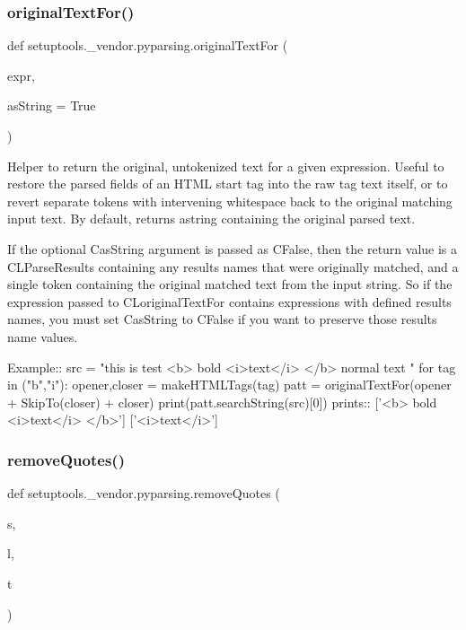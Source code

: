 \subsubsection{\texorpdfstring{original\+Text\+For()}{originalTextFor()}}
{\footnotesize\ttfamily def setuptools.\+\_\+vendor.\+pyparsing.\+original\+Text\+For (\begin{DoxyParamCaption}\item[{}]{expr,  }\item[{}]{as\+String = {\ttfamily True} }\end{DoxyParamCaption})}

\begin{DoxyVerb}Helper to return the original, untokenized text for a given expression.  Useful to
restore the parsed fields of an HTML start tag into the raw tag text itself, or to
revert separate tokens with intervening whitespace back to the original matching
input text. By default, returns astring containing the original parsed text.  
   
If the optional C{asString} argument is passed as C{False}, then the return value is a 
C{L{ParseResults}} containing any results names that were originally matched, and a 
single token containing the original matched text from the input string.  So if 
the expression passed to C{L{originalTextFor}} contains expressions with defined
results names, you must set C{asString} to C{False} if you want to preserve those
results name values.

Example::
    src = "this is test <b> bold <i>text</i> </b> normal text "
    for tag in ("b","i"):
        opener,closer = makeHTMLTags(tag)
        patt = originalTextFor(opener + SkipTo(closer) + closer)
        print(patt.searchString(src)[0])
prints::
    ['<b> bold <i>text</i> </b>']
    ['<i>text</i>']
\end{DoxyVerb}
 \mbox{\label{namespacesetuptools_1_1__vendor_1_1pyparsing_a146c391ca15df73c8a611ec533af2c5e}} 
\subsubsection{\texorpdfstring{remove\+Quotes()}{removeQuotes()}}
{\footnotesize\ttfamily def setuptools.\+\_\+vendor.\+pyparsing.\+remove\+Quotes (\begin{DoxyParamCaption}\item[{}]{s,  }\item[{}]{l,  }\item[{}]{t }\end{DoxyParamCaption})}

